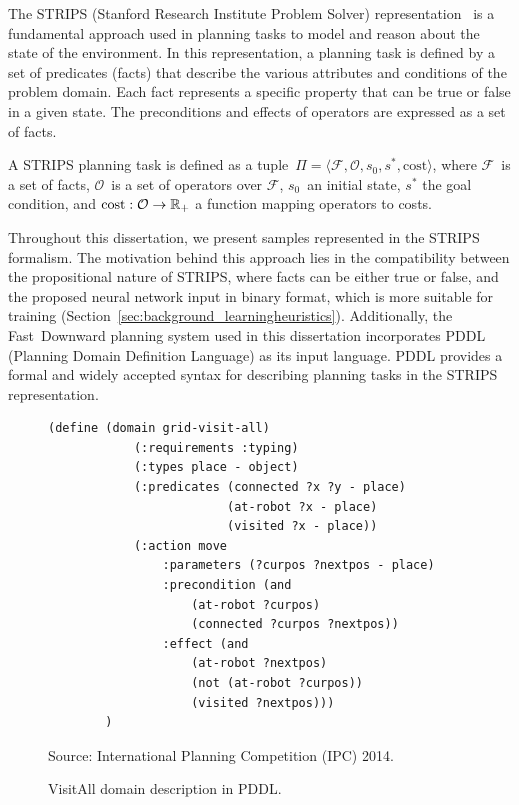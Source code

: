 The STRIPS (Stanford Research Institute Problem Solver) representation~\cite{Fikes.Nilsson/1971} is a fundamental approach used in planning tasks to model and reason about the state of the environment. In this representation, a planning task is defined by a set of predicates (facts) that describe the various attributes and conditions of the problem domain. Each fact represents a specific property that can be true or false in a given state. The preconditions and effects of operators are expressed as a set of facts.

\begin{definition}
    \label{def:stripsplanningtask}
    A STRIPS planning task is defined as a tuple~$\Pi=\langle\mathcal{F},\mathcal{O},s_0,s^*, \text{cost}\rangle$, where $\mathcal{F}$~is a set of facts, $\mathcal{O}$~is a set of operators over $\mathcal{F}$, $s_0$~an initial state, $s^*$ the goal condition, and $\text{cost}:\mathcal{O}\rightarrow\mathbb{R}_{+}$ a function mapping operators to costs.
\end{definition}

Throughout this dissertation, we present samples represented in the STRIPS formalism. The motivation behind this approach lies in the compatibility between the propositional nature of STRIPS, where facts can be either true or false, and the proposed neural network input in binary format, which is more suitable for training (Section~\ref{sec:background_learningheuristics}). Additionally, the Fast~Downward planning system used in this dissertation incorporates PDDL (Planning Domain Definition Language) as its input language. PDDL provides a formal and widely accepted syntax for describing planning tasks in the STRIPS representation.

\begin{figure}[ht]
\caption{VisitAll domain description in PDDL.}
\label{fig:pddl}
\addvspace{\baselineskip}
\centering
\begin{lstlisting}[basicstyle=\ttfamily]
        (define (domain grid-visit-all)
            (:requirements :typing)
            (:types place - object)
            (:predicates (connected ?x ?y - place)
                         (at-robot ?x - place)
                         (visited ?x - place))
            (:action move
                :parameters (?curpos ?nextpos - place)
                :precondition (and
                    (at-robot ?curpos)
                    (connected ?curpos ?nextpos))
                :effect (and 
                    (at-robot ?nextpos)
                    (not (at-robot ?curpos))
                    (visited ?nextpos)))
        )
\end{lstlisting}
Source: International Planning Competition (IPC) 2014.
\end{figure}

